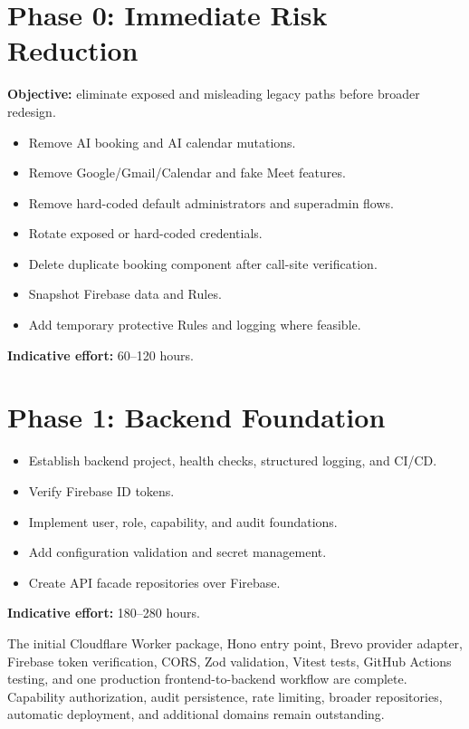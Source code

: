 \documentclass[11pt,a4paper,oneside]{report}
\begin{document}
\section{Phase 0: Immediate Risk Reduction}

\textbf{Objective:} eliminate exposed and misleading legacy paths before broader redesign.

\begin{taskbox}[-- Deliverables]
\begin{itemize}
  \item Remove AI booking and AI calendar mutations.
  \item Remove Google/Gmail/Calendar and fake Meet features.
  \item Remove hard-coded default administrators and superadmin flows.
  \item Rotate exposed or hard-coded credentials.
  \item Delete duplicate booking component after call-site verification.
  \item Snapshot Firebase data and Rules.
  \item Add temporary protective Rules and logging where feasible.
\end{itemize}
\end{taskbox}

\textbf{Indicative effort:} 60--120 hours.

\section{Phase 1: Backend Foundation}

\begin{itemize}
  \item Establish backend project, health checks, structured logging, and CI/CD.
  \item Verify Firebase ID tokens.
  \item Implement user, role, capability, and audit foundations.
  \item Add configuration validation and secret management.
  \item Create API facade repositories over Firebase.
\end{itemize}

\textbf{Indicative effort:} 180--280 hours.

\begin{notebox}
The initial Cloudflare Worker package, Hono entry point, Brevo provider adapter, Firebase token verification, CORS, Zod validation, Vitest tests, GitHub Actions testing, and one production frontend-to-backend workflow are complete. Capability authorization, audit persistence, rate limiting, broader repositories, automatic deployment, and additional domains remain outstanding.
\end{notebox}
\end{document}
